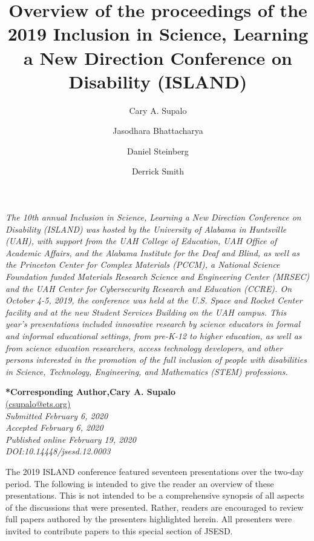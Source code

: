 \documentclass[11.5pt]{sig-alternate} %
\begin{document}
\title{Overview of the proceedings of the 2019 Inclusion in Science, Learning a New Direction Conference on Disability (ISLAND)}

\author[1]{\large \color{blue}Cary A. Supalo}
\author[2]{\large \color{blue}Jasodhara Bhattacharya}
\author[2]{\large \color{blue}Daniel Steinberg}
\author[3]{\large \color{blue}Derrick Smith}
\toappear{}
\maketitle
\begin{large}
\textit{The 10th annual Inclusion in Science, Learning a New Direction Conference on Disability (ISLAND) was hosted by the University of Alabama in Huntsville (UAH), with support from the UAH College of Education, UAH Office of Academic Affairs, and the Alabama Institute for the Deaf and Blind, as well as the Princeton Center for Complex Materials (PCCM), a National Science Foundation funded Materials Research Science and Engineering Center (MRSEC) and the UAH Center for Cybersecurity Research and Education (CCRE). On October 4-5, 2019, the conference was held at the U.S. Space and Rocket Center facility and at the new Student Services Building on the UAH campus. This year’s presentations included innovative research by science educators in formal and informal educational settings, from pre-K-12 to higher education, as well as from science education researchers, access technology developers, and other persons interested in the promotion of the full inclusion of people with disabilities in Science, Technology, Engineering, and Mathematics (STEM) professions.}
\end{large}

\textbf{*Corresponding Author,Cary A. Supalo }\\
\href{mailto: csupalo@ets.org }{(csupalo@ets.org)} \\
\textit{Submitted  February 6, 2020}\\
\textit{Accepted February 6, 2020} \\
\textit{Published online February 19, 2020} \\
\textit{DOI:10.14448/jsesd.12.0003} \\

\begin{large}
The 2019 ISLAND conference featured seventeen presentations over the two-day period. The following is intended to give the reader an overview of these presentations. This is not intended to be a comprehensive synopsis of all aspects of the discussions that were presented. Rather, readers are encouraged to review full papers authored by the presenters highlighted herein. All presenters were invited to contribute papers to this special section of JSESD.
\end{large}
\end{document}
